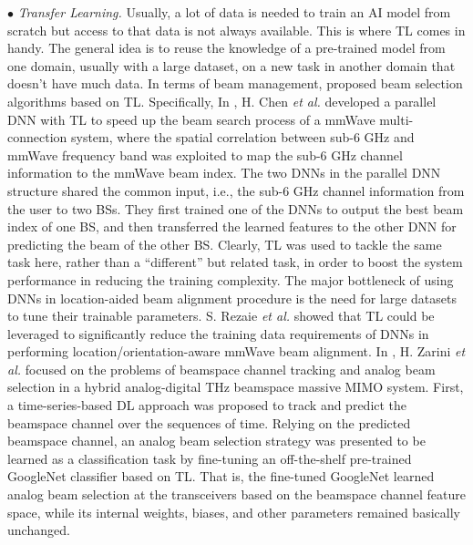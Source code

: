 \documentclass[journal,comsoc]{IEEEtran}
\begin{document}
$\bullet$ \emph{Transfer Learning.} Usually, a lot of data is needed to train an AI model from scratch but access to that data is not always available. This is where TL \cite{Survey-Transfer-Learning-2021} comes in handy. The general idea is to reuse the knowledge of a pre-trained model from one domain, usually with a large dataset, on a new task in another domain that doesn't have much data. In terms of beam management, \cite{Beams-Selection-MmWave-Multi-Connection-2021,Deep-Transfer-Learning-Location-Aware-2021,Intelligent-Analog-Beam-Selection-Beamspace-Channel-Tracking-2023} proposed beam selection algorithms based on TL. Specifically, In \cite{Beams-Selection-MmWave-Multi-Connection-2021}, H. Chen \emph{et al.} developed a parallel DNN with TL to speed up the beam search process of a mmWave multi-connection system, where the spatial correlation between sub-6 GHz and mmWave frequency band was exploited to map the sub-6 GHz channel information to the mmWave beam index. The two DNNs in the parallel DNN structure shared the common input, i.e., the sub-6 GHz channel information from the user to two BSs. They first trained one of the DNNs to output the best beam index of one BS, and then transferred the learned features to the other DNN for predicting the beam of the other BS. Clearly, TL was used to tackle the same task here, rather than a ``different'' but related task, in order to boost the system performance in reducing the training complexity. The major bottleneck of using DNNs in location-aided beam alignment procedure is the need for large datasets to tune their trainable parameters. S. Rezaie \emph{et al.} \cite{Deep-Transfer-Learning-Location-Aware-2021} showed that TL could be leveraged to significantly reduce the training data requirements of DNNs in performing location/orientation-aware mmWave beam alignment. In \cite{Intelligent-Analog-Beam-Selection-Beamspace-Channel-Tracking-2023}, H. Zarini \emph{et al.} focused on the problems of beamspace channel tracking and analog beam selection in a hybrid analog-digital THz beamspace massive MIMO system. First, a time-series-based DL approach was proposed to track and predict the beamspace channel over the sequences of time. Relying on the predicted beamspace channel, an analog beam selection strategy was presented to be learned as a classification task by fine-tuning an off-the-shelf pre-trained GoogleNet classifier based on TL. That is, the fine-tuned GoogleNet learned analog beam selection at the transceivers based on the beamspace channel feature space, while its internal weights, biases, and other parameters remained basically unchanged.
\end{document}
